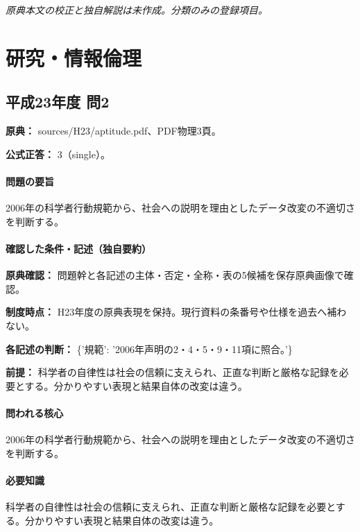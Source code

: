 \par\textit{原典本文の校正と独自解説は未作成。分類のみの登録項目。}

\section{研究・情報倫理}

\subsection{平成23年度 問2}
\label{q:h23-reg-apt-02}

\noindent\textbf{原典：} sources/H23/aptitude.pdf、PDF物理3頁。

\textbf{公式正答：} 3（single）。

\paragraph{問題の要旨} 2006年の科学者行動規範から、社会への説明を理由としたデータ改変の不適切さを判断する。

\paragraph{確認した条件・記述（独自要約）}\mbox{}\par

\noindent\textbf{原典確認：} 問題幹と各記述の主体・否定・全称・表の5候補を保存原典画像で確認。\par

\noindent\textbf{制度時点：} H23年度の原典表現を保持。現行資料の条番号や仕様を過去へ補わない。\par

\noindent\textbf{各記述の判断：} \{'規範': '2006年声明の2・4・5・9・11項に照合。'\}\par

\noindent\textbf{前提：} 科学者の自律性は社会の信頼に支えられ、正直な判断と厳格な記録を必要とする。分かりやすい表現と結果自体の改変は違う。\par

\paragraph{問われる核心} 2006年の科学者行動規範から、社会への説明を理由としたデータ改変の不適切さを判断する。

\paragraph{必要知識} 科学者の自律性は社会の信頼に支えられ、正直な判断と厳格な記録を必要とする。分かりやすい表現と結果自体の改変は違う。

